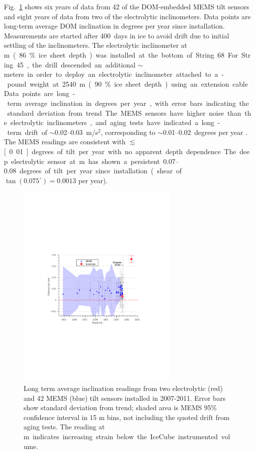 Fig.~\ref{fig:tilt} shows
six years of data from 42 of the DOM-embedded MEMS tilt sensors and
eight years of data from two of the electrolytic inclinometers. Data
points are long-term average DOM inclination in degrees per year since
installation. Measurements are started after 400~days in ice to avoid
drift due to initial settling of the inclinometers. The electrolytic inclinometer at \unit[2455]m (86\% ice sheet depth) was
installed at the bottom of String 68.  For String 45, the drill
descended an additional $\sim$\unit[100]meters in order to deploy an
electrolytic inclinometer attached to a \unit[100]-pound weight at 2540 m
(90\% ice sheet depth) using an extension cable. Data
points are long-term average inclination in degrees per year, with error
bars indicating the standard deviation from trend.  The MEMS sensors have
higher noise than the electrolytic inclinometers, and aging tests have indicated a long-term
drift of $\sim$\numrange[range-phrase = --]{0.02}{0.03}~m/s$^2$, corresponding to
$\sim$\numrange[range-phrase = --]{0.01}{0.02}~degrees per year
\cite{inclinometer_comm}. The MEMS readings are consistent with
$\lesssim$\unit[0.01]degrees of tilt per year with no apparent depth
dependence.  The deep electrolytic sensor 
at \unit[2540]m has shown a persistent \numrange[range-phrase =
  --]{0.07}{0.08} degrees of tilt per year since installation (shear
  of $\tan(0.075^\circ) = 0.0013$
per year).

\begin{figure}[!ht]
	\centering
    \includegraphics[width=0.7\textwidth]{graphics/geometry/tilt5.pdf}
	\caption{Long term average inclination readings from two electrolytic
      (red) and 42 MEMS (blue) tilt sensors installed in 2007-2011.  Error
      bars show standard deviation from trend; shaded area is MEMS 95\%
      confidence interval in 15 m bins, not including the quoted drift
      from aging tests.  The reading at \unit[2540]m
      indicates increasing strain below the IceCube instrumented volume.}
	\label{fig:tilt}
\end{figure}

